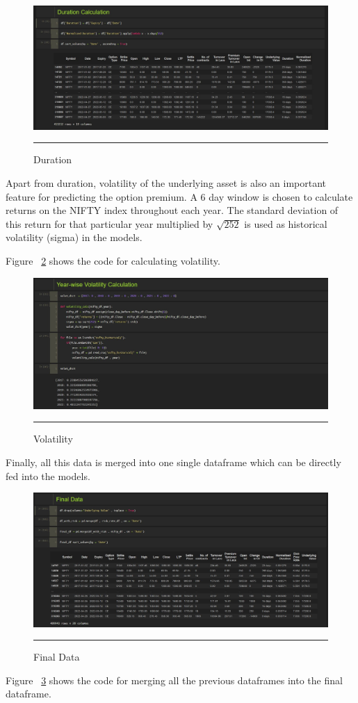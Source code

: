 \begin{figure}[htbp]
  \centering
    \includegraphics[scale=0.42]{Figures/data_prep_duration.JPG}
    \rule{35em}{0.5pt}
  \caption[Duration Calculation]{Duration}
  \label{fig:data_prep_duration}
\end{figure}

Apart from duration, volatility of the underlying asset is also an important feature for predicting the option premium. A 6 day window is chosen to calculate returns on the NIFTY index throughout each year. The standard deviation of this return for that particular year multiplied by $\sqrt{252}$ is used as historical volatility (sigma) in the models.

Figure ~\ref{fig:data_prep_volat} shows the code for calculating volatility. 

\begin{figure}[htbp]
  \centering
    \includegraphics[scale=0.45]{Figures/data_prep_volat.JPG}
    \rule{35em}{0.5pt}
  \caption[Volatility Calculation]{Volatility}
  \label{fig:data_prep_volat}
\end{figure}

Finally, all this data is merged into one single dataframe which can be directly fed into the models.

\begin{figure}[htbp]
  \centering
    \includegraphics[scale=0.44]{Figures/data_prep_final.JPG}
    \rule{35em}{0.5pt}
  \caption[Final Data]{Final Data}
  \label{fig:data_prep_final}
\end{figure}

Figure ~\ref{fig:data_prep_final} shows the code for merging all the previous dataframes into the final dataframe. 

